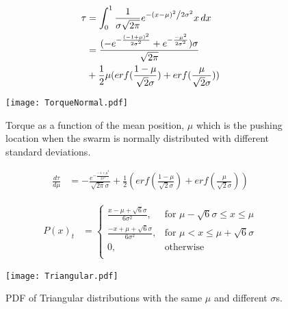 \begin{align} \nonumber
\tau &= \int_0^1\frac{1}{{\sigma \sqrt {2\pi } }}e^{{{ - \left( {x - \mu } \right)^2 } \mathord{\left/ {\vphantom {{ - \left( {x - \mu } \right)^2 } {2\sigma ^2 }}} \right. \kern-\nulldelimiterspace} {2\sigma ^2 }}} x \, dx\\ \nonumber
&= \frac{(-e^{-\frac{(-1+\mu)^2}{2\sigma^2}}+e^{-\frac{-\mu^2}{2\sigma^2}})\sigma}{\sqrt{2\pi}}\\ 
&+ \frac{1}{2}\mu(erf(\frac{1-\mu}{\sqrt{2}\sigma})+erf(\frac{\mu}{\sqrt{2}\sigma})) 
\end{align}
\begin{figure}
\begin{center}
	\texttt{[image: TorqueNormal.pdf]}
\end{center}
\vspace{-1em}
\caption{\label{fig:torqueNorm}
Torque as a function of the mean position, $\mu$ which is the pushing location when the swarm is normally distributed with different standard deviations.
}
\vspace{-1em}
\end{figure}
\begin{align} 
\frac{d\tau}{d\mu} &= -\frac{e^{-\frac{{-1+\mu}^2}{2\sigma^2}}}{\sqrt{2\pi}\sigma} + \frac{1}{2}(erf(\frac{1-\mu}{\sqrt{2}\sigma})+erf(\frac{\mu}{\sqrt{2}\sigma})) 
\end{align}


\begin{align}
P(x)_{t} &=  \left\{
\begin{array}{ll}
    \frac{x-\mu + \sqrt{6} \sigma}{6\sigma^2}, &  \textrm{for   } \mu-\sqrt{6}\sigma \leq x \leq \mu\\
     \frac{-x+\mu + \sqrt{6} \sigma}{6\sigma^2}, &  \textrm{for   } \mu < x \leq \mu+ \sqrt{6}\sigma\\
     0, & \textrm{otherwise}\\
\end{array} 
\right.
\end{align}

\begin{figure}
\begin{center}
	\texttt{[image: Triangular.pdf]}
\end{center}
\vspace{-1em}
\caption{\label{fig:pdfTri}
PDF of Triangular distributions with the same $\mu$ and different $\sigma$s.
}
\vspace{-1em}
\end{figure}

